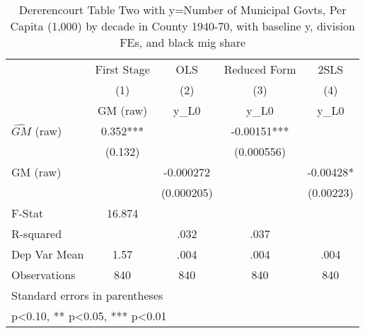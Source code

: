 \begin{table}[htbp]\centering
\def\sym#1{\ifmmode^{#1}\else\(^{#1}\)\fi}
\caption{Dererencourt Table Two with y=Number of Municipal Govts, Per Capita (1,000) by decade in County 1940-70, with baseline y, division FEs, and black mig share}
\begin{tabular}{l*{4}{c}}
\toprule
                    & First Stage   &         OLS   &Reduced Form   &        2SLS   \\
                    &\multicolumn{1}{c}{(1)}&\multicolumn{1}{c}{(2)}&\multicolumn{1}{c}{(3)}&\multicolumn{1}{c}{(4)}\\
                    &\multicolumn{1}{c}{GM  (raw)}&\multicolumn{1}{c}{y\_L0}&\multicolumn{1}{c}{y\_L0}&\multicolumn{1}{c}{y\_L0}\\
\midrule
$\hat{GM}$ (raw)    &       0.352***&               &    -0.00151***&               \\
                    &     (0.132)   &               &  (0.000556)   &               \\
\addlinespace
GM  (raw)           &               &   -0.000272   &               &    -0.00428*  \\
                    &               &  (0.000205)   &               &   (0.00223)   \\
\midrule
F-Stat              &      16.874   &               &               &               \\
R-squared           &               &        .032   &        .037   &               \\
Dep Var Mean        &        1.57   &        .004   &        .004   &        .004   \\
Observations        &         840   &         840   &         840   &         840   \\
\bottomrule
\multicolumn{5}{l}{\footnotesize Standard errors in parentheses}\\
\multicolumn{5}{l}{\footnotesize * p<0.10, ** p<0.05, *** p<0.01}\\
\end{tabular}
\end{table}
